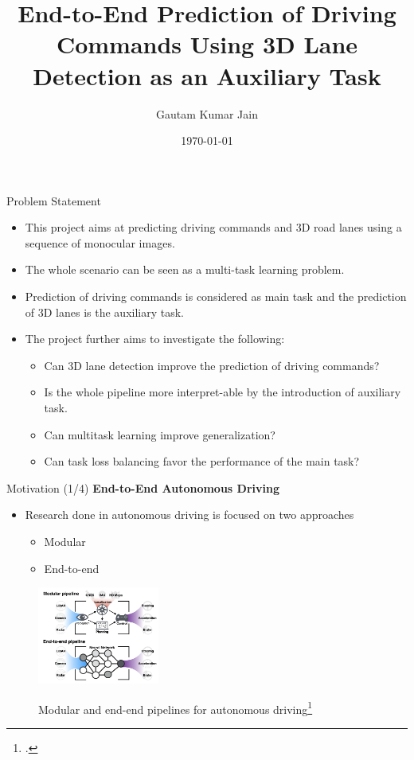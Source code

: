 \documentclass[aspectratio=169]{beamer}
\author[Jain]{Gautam Kumar Jain}
\title{End-to-End Prediction of Driving
Commands Using 3D Lane Detection as an
Auxiliary Task}
\institute[HBRS]{Hochschule Bonn-Rhein-Sieg}
\date{\today}
\begin{document}
{
\begin{frame}
\titlepage
\end{frame}
}

\begin{frame}{Problem Statement}
    \begin{itemize}
        \item This project aims at predicting driving commands and 3D road lanes using a sequence of monocular images.
        \item The whole scenario can be seen as a multi-task learning problem.
        \item Prediction of driving commands is considered as main task and the prediction of 3D lanes is the auxiliary task.
        \item The project further aims to investigate the following: 
        \begin{itemize}
            \item Can 3D lane detection improve the prediction of driving commands? 
            \item Is the whole pipeline more interpret-able by the introduction of auxiliary task.
            \item Can multitask learning improve generalization? 
            \item Can task loss balancing favor the performance of the main task? 
        \end{itemize}
    \end{itemize}
\end{frame}

\begin{frame}{Motivation (1/4)}
  \textbf{End-to-End Autonomous Driving}
  \begin{itemize}
    \item Research done in autonomous driving is focused on two approaches
        \begin{itemize}
            \item Modular 
            \item End-to-end 
        \end{itemize}
        
  \end{itemize}
    \begin{figure}[H]
     \centering
     
\includegraphics[width=0.4\linewidth, height=3.2cm]{images/end-modular.png} 
\label{fig:subim1}

\caption{Modular and end-end pipelines for autonomous driving\footcite{DBLP:journals/corr/abs-2003-06404}}
\label{fig:image2}
\end{figure}
\end{frame}
\end{document}
